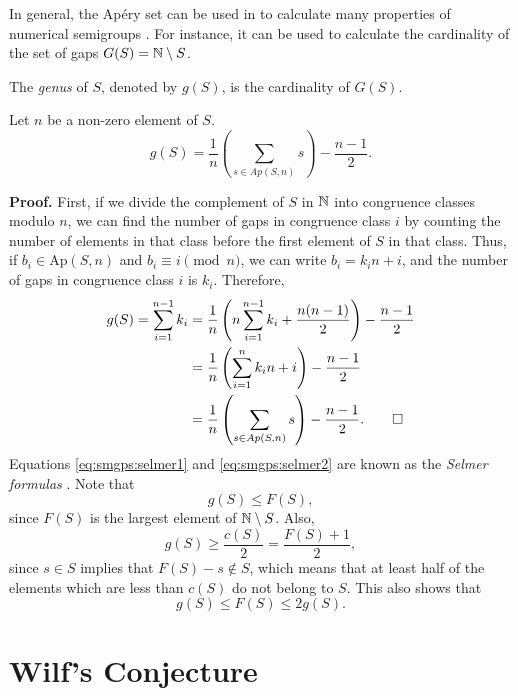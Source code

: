 In general, the Apéry set can be used in to calculate many properties of numerical semigroups \cite{apery1946branches}. For instance, it can be used to calculate the cardinality of the set of gaps $G(S) = \mathbb{N} \setminus S$.

\begin{definition}\label{def:smgps:genus}
    The \textit{genus} of $S$, denoted by $g(S)$, is the cardinality of $G(S)$.
\end{definition}

\begin{proposition} Let $n$ be a non-zero element of $S$. 
    \begin{equation}\label{eq:smgps:selmer2}
        g(S) = \frac{1}{n}\left(\sum_{s \in Ap(S, n)} s\right) - \frac{n - 1}{2}.
    \end{equation}
\end{proposition}
\textbf{Proof. } First, if we divide the complement of $S$ in $\mathbb{N}$ into congruence classes modulo $n$, we can find the number of gaps in congruence class $i$ by counting the number of elements in that class before the first element of $S$ in that class. Thus, if $b_i \in \mathrm{Ap}(S, n)$ and $b_i \equiv i \pmod n$, we can write $b_i = k_i n + i$, and the number of gaps in congruence class $i$ is $k_i$. Therefore,
\begin{align*}
    g(S) = \sum_{i = 1}^{n - 1} k_i &=  \frac{1}{n}\left(n\sum_{i = 1}^{n - 1} k_i + \frac{n(n - 1)}{2}\right) - \frac{n - 1}{2} \\
    &= \frac{1}{n}\left(\sum_{i = 1}^n k_i n + i \right) - \frac{n - 1}{2} \\
    &= \frac{1}{n}\left(\sum_{s \in Ap(S, n)} s \right) - \frac{n - 1}{2}. \qed
\end{align*}
Equations \ref{eq:smgps:selmer1} and \ref{eq:smgps:selmer2} are known as the \textit{Selmer formulas} \cite{selmer1977linear}. Note that \[g(S) \leq F(S),\] since $F(S)$ is the largest element of $\mathbb{N} \setminus S$. Also, 
\[g(S) \geq \frac{c(S)}{2} = \frac{F(S) + 1}{2},\]
since $s \in S$ implies that $F(S) - s \notin S$, which means that at least half of the elements which are less than $c(S)$ do not belong to $S$.  This also shows that
\begin{equation}\label{eq:smgps:frobgenus}
    g(S) \leq F(S) \leq 2g(S).
\end{equation}

\section{Wilf's Conjecture}\label{sec:smgps:theme2}


